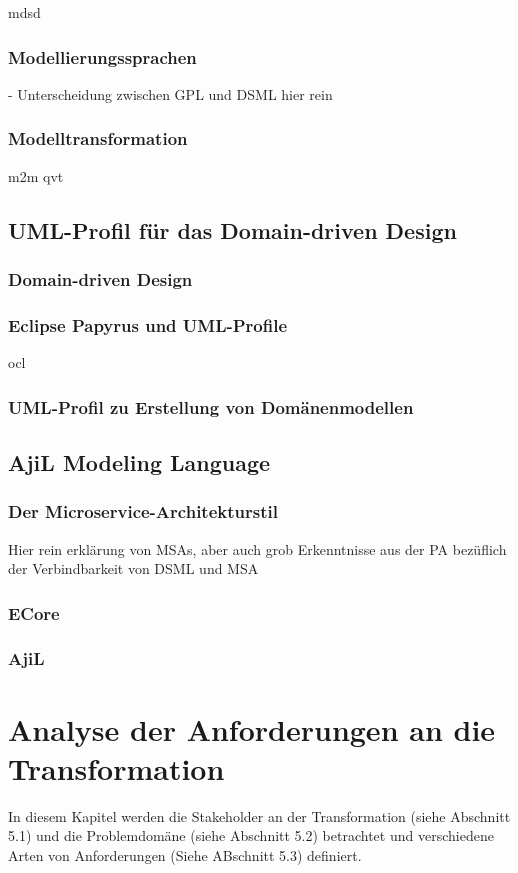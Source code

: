 \documentclass[
	oneside,  %
	ngerman, 
	final, 
	11pt, 
	a4paper, 
	1.1headlines, 
	headinclude=false, 
	footinclude=false, 
	mpinclude=false, 
	pagesize, 
	onecolumn, 
	titlepage, 
	parskip=half, 
	headsepline, 
	chapterprefix=false, 
	version=first, 
	listof=totoc, 
	bibliography=totoc, 
	toc=graduated, 
	fleqn
]{scrbook}
\begin{document}
\ac{mdsd}

\subsection{Modellierungssprachen}
- Unterscheidung zwischen GPL und DSML hier rein\\

\subsection{Modelltransformation}
\ac{m2m}
\ac{qvt}

\section{UML-Profil für das Domain-driven Design}

\subsection{Domain-driven Design}
\subsection{Eclipse Papyrus und UML-Profile}
\ac{ocl}
\subsection{UML-Profil zu Erstellung von Domänenmodellen}

\section{AjiL Modeling Language}
\subsection{Der Microservice-Architekturstil}
Hier rein erklärung von MSAs, aber auch grob Erkenntnisse aus der PA bezüflich der Verbindbarkeit von DSML und MSA
\subsection{ECore}
\subsection{AjiL}

\chapter{Analyse der Anforderungen an die Transformation} %
In diesem Kapitel werden die Stakeholder an der Transformation (siehe Abschnitt 5.1) und die Problemdomäne (siehe Abschnitt 5.2) betrachtet und verschiedene Arten von Anforderungen (Siehe ABschnitt 5.3) definiert. %
\end{document}
